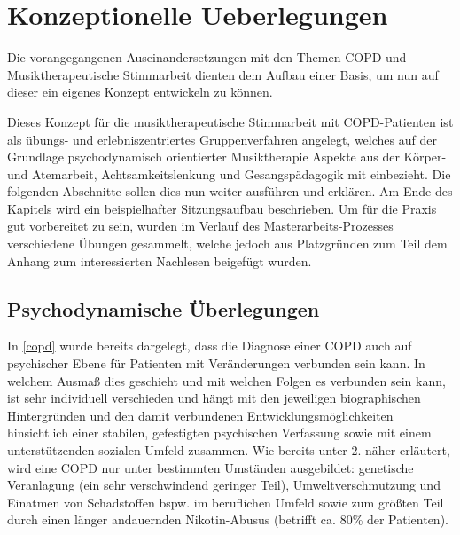 
\ifpdf
\graphicspath{{4_konzept/figures/PNG/}{4_konzept/figures/PDF/}{4_konzept/figures/}}
\else
    \graphicspath{{4_konzept/figures/EPS/}{4_konzept/figures/}}
\fi

\chapter{Konzeptionelle Ueberlegungen}
\label{chapter:konzeptionelle_ueberlegungen}
Die vorangegangenen Auseinandersetzungen mit den Themen COPD und Musiktherapeutische Stimmarbeit dienten dem Aufbau einer Basis, um nun auf dieser ein eigenes Konzept entwickeln zu können. 

Dieses Konzept für die musiktherapeutische Stimmarbeit mit COPD-Patienten ist als übungs- und erlebniszentriertes Gruppenverfahren angelegt, welches auf der Grundlage psychodynamisch orientierter Musiktherapie Aspekte aus der Körper- und Atemarbeit, Achtsamkeitslenkung und Gesangspädagogik mit einbezieht. Die folgenden Abschnitte sollen dies nun weiter ausführen und erklären. Am Ende des Kapitels wird ein beispielhafter Sitzungsaufbau beschrieben. Um für die Praxis gut vorbereitet zu sein, wurden im Verlauf des Masterarbeits-Prozesses verschiedene Übungen gesammelt, welche jedoch aus Platzgründen zum Teil dem Anhang zum interessierten Nachlesen beigefügt wurden.


\section{Psychodynamische Überlegungen}
\label{psychodynamische ueberlegungen}
In \ref{copd} wurde bereits dargelegt, dass die Diagnose einer COPD auch auf psychischer Ebene für Patienten mit Veränderungen verbunden sein kann. In welchem Ausmaß dies geschieht und mit welchen Folgen es verbunden sein kann, ist sehr individuell verschieden und hängt mit den jeweiligen biographischen Hintergründen und den damit verbundenen Entwicklungsmöglichkeiten hinsichtlich einer stabilen, gefestigten psychischen Verfassung sowie mit einem unterstützenden sozialen Umfeld zusammen. 
Wie bereits unter 2. näher erläutert, wird eine COPD nur unter bestimmten Umständen ausgebildet: genetische Veranlagung (ein sehr verschwindend geringer Teil), Umweltverschmutzung und Einatmen von Schadstoffen bspw. im beruflichen Umfeld sowie zum größten Teil durch einen länger andauernden Nikotin-Abusus (betrifft ca. 80\% der Patienten). 

